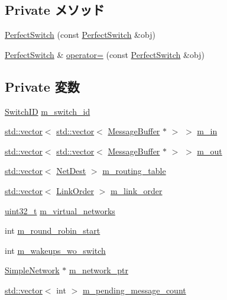 \subsection*{Private メソッド}
\begin{DoxyCompactItemize}
\item 
\hyperlink{classPerfectSwitch_a787abd150358b9f808fe959f9cb079ee}{PerfectSwitch} (const \hyperlink{classPerfectSwitch}{PerfectSwitch} \&obj)
\item 
\hyperlink{classPerfectSwitch}{PerfectSwitch} \& \hyperlink{classPerfectSwitch_ab37620fb3c7a42bfae3ac244e4f3c3ac}{operator=} (const \hyperlink{classPerfectSwitch}{PerfectSwitch} \&obj)
\end{DoxyCompactItemize}
\subsection*{Private 変数}
\begin{DoxyCompactItemize}
\item 
\hyperlink{TypeDefines_8hh_ac925a332c83eaf1e40e056e7a20ebcd8}{SwitchID} \hyperlink{classPerfectSwitch_aace5aee128494c07cfc442438ef9d0cd}{m\_\-switch\_\-id}
\item 
\hyperlink{classstd_1_1vector}{std::vector}$<$ \hyperlink{classstd_1_1vector}{std::vector}$<$ \hyperlink{classMessageBuffer}{MessageBuffer} $\ast$ $>$ $>$ \hyperlink{classPerfectSwitch_ab0345216ab4e417dda296ba970b74c70}{m\_\-in}
\item 
\hyperlink{classstd_1_1vector}{std::vector}$<$ \hyperlink{classstd_1_1vector}{std::vector}$<$ \hyperlink{classMessageBuffer}{MessageBuffer} $\ast$ $>$ $>$ \hyperlink{classPerfectSwitch_a6a473b3d280f223c89ffc2f5827d523f}{m\_\-out}
\item 
\hyperlink{classstd_1_1vector}{std::vector}$<$ \hyperlink{classNetDest}{NetDest} $>$ \hyperlink{classPerfectSwitch_adce3e392ac98699a80750fa4a4aa9b40}{m\_\-routing\_\-table}
\item 
\hyperlink{classstd_1_1vector}{std::vector}$<$ \hyperlink{structLinkOrder}{LinkOrder} $>$ \hyperlink{classPerfectSwitch_a3dfc7818b7839c506d99739067de07db}{m\_\-link\_\-order}
\item 
\hyperlink{Type_8hh_a435d1572bf3f880d55459d9805097f62}{uint32\_\-t} \hyperlink{classPerfectSwitch_a3c1d97c5d987e52985843dcb76edc7fb}{m\_\-virtual\_\-networks}
\item 
int \hyperlink{classPerfectSwitch_af4ca19e1a3ce236185490cf7e67f86d3}{m\_\-round\_\-robin\_\-start}
\item 
int \hyperlink{classPerfectSwitch_aae3ca2ac27d25e29fa0b1856a862d658}{m\_\-wakeups\_\-wo\_\-switch}
\item 
\hyperlink{classSimpleNetwork}{SimpleNetwork} $\ast$ \hyperlink{classPerfectSwitch_a512555c08578dfab6c301b43cc2b0f1b}{m\_\-network\_\-ptr}
\item 
\hyperlink{classstd_1_1vector}{std::vector}$<$ int $>$ \hyperlink{classPerfectSwitch_a39fc69c7cb772cc966b371aa7de444b9}{m\_\-pending\_\-message\_\-count}
\end{DoxyCompactItemize}


